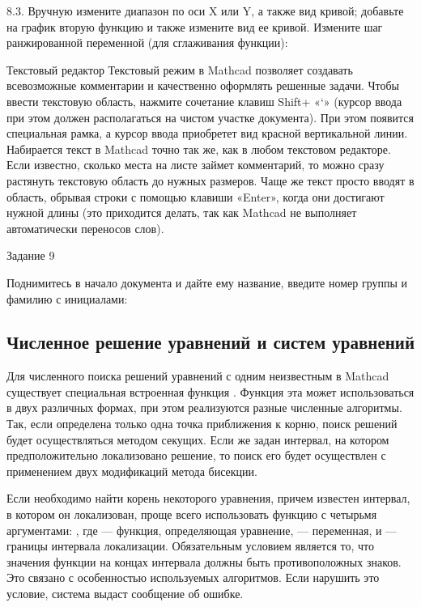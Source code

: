 8.3. Вручную измените диапазон по оси X или Y, а также вид кривой; добавьте на график вторую функцию и также измените вид ее кривой. Измените шаг ранжированной переменной (для сглаживания функции):




Текстовый редактор
Текстовый режим в Mathcad позволяет создавать всевозможные комментарии и качественно оформлять решенные задачи.
Чтобы ввести текстовую область, нажмите сочетание клавиш Shift+ «‘» (курсор ввода при этом должен располагаться на чистом участке документа). При этом появится специальная рамка, а курсор ввода приобретет вид красной вертикальной линии.
Набирается текст в Mathcad точно так же, как в любом текстовом редакторе. Если известно, сколько места на листе займет комментарий, то можно сразу растянуть текстовую область до нужных размеров. Чаще же текст просто вводят в область, обрывая строки с помощью клавиши «Enter», когда они достигают нужной длины (это приходится делать, так как Mathcad не выполняет автоматически переносов слов).

Задание 9

Поднимитесь в начало документа и дайте ему название, введите номер группы и фамилию с инициалами:

\subsection*{Численное решение уравнений и систем уравнений}
Для численного поиска решений уравнений с одним неизвестным в Mathcad существует специальная встроенная функция . Функция эта может использоваться в двух различных формах, при этом реализуются разные численные алгоритмы. Так, если определена только одна точка приближения к корню, поиск решений будет осуществляться методом секущих. Если же задан интервал, на котором предположительно локализовано решение, то поиск его будет осуществлен с применением двух модификаций метода бисекции.

Если необходимо найти корень некоторого уравнения, причем известен интервал, в котором он локализован, проще всего использовать функцию с четырьмя аргументами: , где  --- функция, определяющая уравнение,  --- переменная,  и  --- границы интервала локализации. Обязательным условием является то, что значения функции на концах интервала должны быть противоположных знаков. Это связано с особенностью используемых  алгоритмов. Если нарушить это условие, система выдаст сообщение об ошибке.


